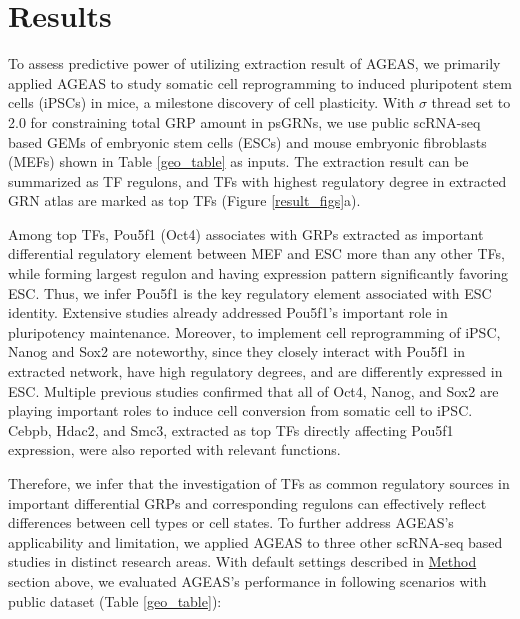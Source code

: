 \documentclass[fleqn,10pt]{wlscirep}
\begin{document}
\section*{Results}
  \label{res}
  To assess predictive power of utilizing extraction result of AGEAS, we primarily applied AGEAS to study somatic cell reprogramming to induced pluripotent stem cells (iPSCs) in mice, \cite{yamanaka_2006} a milestone discovery of cell plasticity. \cite{cell_repro_review}
  With $\sigma$ thread set to 2.0 for constraining total GRP amount in psGRNs, we use public scRNA-seq based GEMs of embryonic stem cells (ESCs) and mouse embryonic fibroblasts (MEFs) shown in Table \ref{geo_table} as inputs.
  The extraction result can be summarized as TF regulons, and TFs with highest regulatory degree in extracted GRN atlas are marked as top TFs (Figure \ref{result_figs}a).

  Among top TFs, Pou5f1 (Oct4) associates with GRPs extracted as important differential regulatory element between MEF and ESC more than any other TFs, while forming largest regulon and having expression pattern significantly favoring ESC.
  Thus, we infer Pou5f1 is the key regulatory element associated with ESC identity.
  Extensive studies already addressed Pou5f1's important role in pluripotency maintenance. \cite{niwa_2007, oct4_1, oct4_2}
  Moreover, to implement cell reprogramming of iPSC, Nanog and Sox2 are noteworthy, since they closely interact with Pou5f1 in extracted network, have high regulatory degrees, and are differently expressed in ESC.
  Multiple previous studies confirmed that all of Oct4, Nanog, and Sox2 are playing important roles to induce cell conversion from somatic cell to iPSC. \cite{yamanaka_2006, ips7f, ipsOK, oct4_nanog_sox2_lin28, oct4_nanog_sox2}
  Cebpb, Hdac2, and Smc3, extracted as top TFs directly affecting Pou5f1 expression, were also reported with relevant functions. \cite{cebpb_ipsc, hdac2_ipsc, rad21_smc3_esc}

  Therefore, we infer that the investigation of TFs as common regulatory sources in important differential GRPs and corresponding regulons can effectively reflect differences between cell types or cell states.
  To further address AGEAS's applicability and limitation, we applied AGEAS to three other scRNA-seq based studies in distinct research areas.
  With default settings described in \hyperref[method]{Method} section above, we evaluated AGEAS's performance in following scenarios with public dataset (Table \ref{geo_table}):
\end{document}
